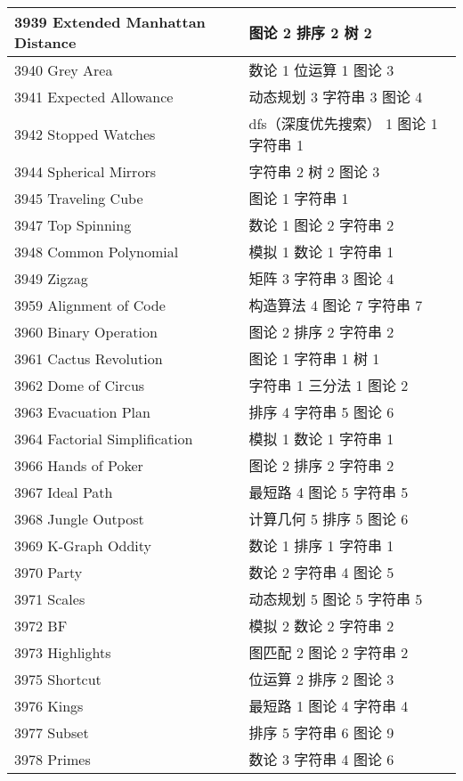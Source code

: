 \begin{longtable}{| p{} | p{} |}
 3939 Extended Manhattan Distance  & 图论 2 排序 2 树 2 \\ \hline
 3940 Grey Area  & 数论 1 位运算 1 图论 3 \\ \hline
 3941 Expected Allowance  & 动态规划 3 字符串 3 图论 4 \\ \hline
 3942 Stopped Watches  & dfs（深度优先搜索） 1 图论 1 字符串 1 \\ \hline
 3944 Spherical Mirrors  & 字符串 2 树 2 图论 3 \\ \hline
 3945 Traveling Cube  & 图论 1 字符串 1 \\ \hline
 3947 Top Spinning  & 数论 1 图论 2 字符串 2 \\ \hline
 3948 Common Polynomial  & 模拟 1 数论 1 字符串 1 \\ \hline
 3949 Zigzag  & 矩阵 3 字符串 3 图论 4 \\ \hline
 3959 Alignment of Code  & 构造算法 4 图论 7 字符串 7 \\ \hline
 3960 Binary Operation  & 图论 2 排序 2 字符串 2 \\ \hline
 3961 Cactus Revolution  & 图论 1 字符串 1 树 1 \\ \hline
 3962 Dome of Circus  & 字符串 1 三分法 1 图论 2 \\ \hline
 3963 Evacuation Plan  & 排序 4 字符串 5 图论 6 \\ \hline
 3964 Factorial Simplification  & 模拟 1 数论 1 字符串 1 \\ \hline
 3966 Hands of Poker  & 图论 2 排序 2 字符串 2 \\ \hline
 3967 Ideal Path  & 最短路 4 图论 5 字符串 5 \\ \hline
 3968 Jungle Outpost  & 计算几何 5 排序 5 图论 6 \\ \hline
 3969 K-Graph Oddity  & 数论 1 排序 1 字符串 1 \\ \hline
 3970 Party  & 数论 2 字符串 4 图论 5 \\ \hline
 3971 Scales  & 动态规划 5 图论 5 字符串 5 \\ \hline
 3972 BF  & 模拟 2 数论 2 字符串 2 \\ \hline
 3973 Highlights  & 图匹配 2 图论 2 字符串 2 \\ \hline
 3975 Shortcut  & 位运算 2 排序 2 图论 3 \\ \hline
 3976 Kings  & 最短路 1 图论 4 字符串 4 \\ \hline
 3977 Subset  & 排序 5 字符串 6 图论 9 \\ \hline
 3978 Primes  & 数论 3 字符串 4 图论 6 \\ \hline

\end{longtable}
